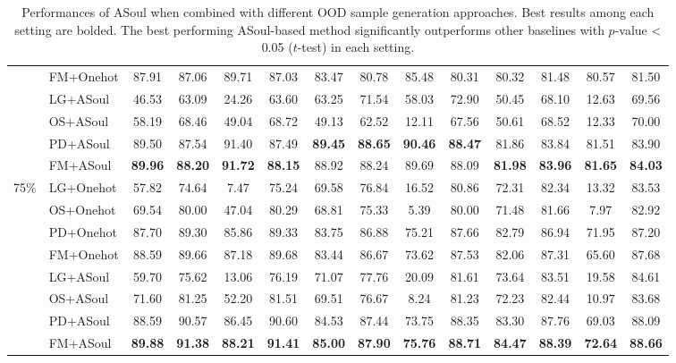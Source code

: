 \documentclass[11pt]{article}
\begin{document}
\begin{table}[t]
\begin{tabular}{cl|cccc|cccc|cccc}
  & FM+Onehot & 87.91 & 87.06 & 89.71 & 87.03 & 83.47 & 80.78 & 85.48 & 80.31 & 80.32 & 81.48 & 80.57 &  81.50 \\
\cmidrule{2-14}
  & LG+ASoul & 46.53 & 63.09 & 24.26 & 63.60 & 63.25 & 71.54 & 58.03 & 72.90 & 50.45 & 68.10 & 12.63 & 69.56\\
  & OS+ASoul & 58.19 & 68.46 & 49.04 & 68.72 & 49.13 & 62.52 & 12.11 & 67.56 & 50.61 & 68.52 & 12.33 & 70.00\\
  & PD+ASoul & 89.50 & 87.54 & 91.40 & 87.49 & \textbf{89.45} & \textbf{88.65} & \textbf{90.46} & \textbf{88.47} & 81.86 & 83.84 & 81.51 & 83.90\\
  & FM+ASoul & \textbf{89.96} & \textbf{88.20} & \textbf{91.72} & \textbf{88.15} & 88.92 & 88.24 & 89.69 & 88.09 & \textbf{81.98} & \textbf{83.96} & \textbf{81.65} & \textbf{84.03}\\
\midrule
\midrule
\multirow{8}{*}{75\%} 
  & LG+Onehot & 57.82 & 74.64 & 7.47 & 75.24 & 69.58 & 76.84 & 16.52 & 80.86 & 72.31 & 82.34 & 13.32 & 83.53\\
  & OS+Onehot & 69.54 & 80.00 & 47.04 & 80.29 & 68.81 & 75.33 & 5.39 & 80.00 & 71.48 & 81.66 & 7.97 & 82.92\\
  & PD+Onehot & 87.70 & 89.30 & 85.86 & 89.33 & 83.75 & 86.88 & 75.21 & 87.66 & 82.79 & 86.94 & 71.95 & 87.20\\
  & FM+Onehot & 88.59 & 89.66 & 87.18 & 89.68 & 83.44 & 86.67 & 73.62 & 87.53 & 82.06 & 87.31 & 65.60 & 87.68 \\
\cmidrule{2-14}
  & LG+ASoul & 59.70 & 75.62 & 13.06 & 76.19 & 71.07 & 77.76 & 20.09 & 81.61 & 73.64 & 83.51 & 19.58 & 84.61\\
  & OS+ASoul & 71.60 & 81.25 & 52.20 & 81.51 & 69.51 & 76.67 & 8.24 & 81.23 & 72.23 & 82.44 & 10.97 & 83.68\\
  & PD+ASoul & 88.59 & 90.57 & 86.45 & 90.60 & 84.53 & 87.44 & 73.75 & 88.35 & 83.30 & 87.76 & 69.03 & 88.09 \\
  & FM+ASoul & \textbf{89.88} & \textbf{91.38} & \textbf{88.21} & \textbf{91.41} & \textbf{85.00} & \textbf{87.90} & \textbf{75.76} & \textbf{88.71} & \textbf{84.47} & \textbf{88.39} & \textbf{72.64} & \textbf{88.66} \\
\bottomrule
\end{tabular}
\centering
\caption{
Performances of ASoul when combined with different OOD sample generation approaches. 
Best results among each setting are bolded.
The best performing ASoul-based method significantly outperforms other baselines with $p$-value < 0.05 ($t$-test) in each setting.}
\label{tab:res_onehot_soft}
\end{table}
\end{document}
